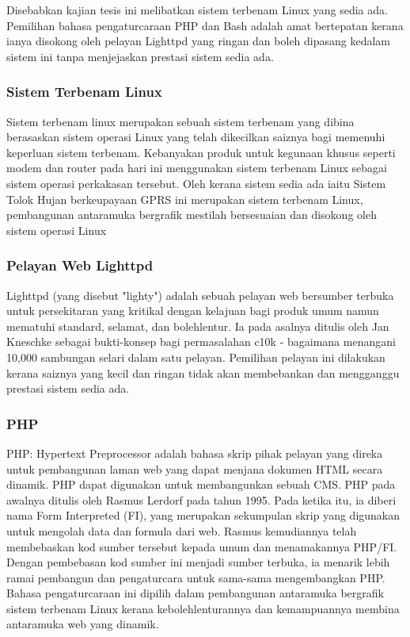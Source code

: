 Disebabkan kajian tesis ini melibatkan sistem terbenam Linux yang sedia ada. Pemilihan bahasa pengaturcaraan PHP dan Bash adalah amat bertepatan kerana ianya disokong oleh pelayan Lighttpd yang ringan dan boleh dipasang kedalam sistem ini tanpa menjejaskan prestasi sistem sedia ada. 

\subsubsection{Sistem Terbenam Linux}
Sistem terbenam linux merupakan sebuah sistem terbenam yang dibina berasaskan sistem operasi Linux yang telah dikecilkan saiznya bagi memenuhi keperluan sistem terbenam. Kebanyakan produk untuk kegunaan khusus seperti modem dan router pada hari ini menggunakan sistem terbenam Linux sebagai sistem operasi perkakasan tersebut. Oleh kerana sistem sedia ada iaitu Sistem Tolok Hujan berkeupayaan GPRS ini merupakan sistem terbenam Linux, pembangunan antaramuka bergrafik mestilah bersesuaian dan disokong oleh sistem operasi Linux

\subsubsection{Pelayan Web Lighttpd}
Lighttpd (yang disebut "lighty") adalah sebuah pelayan web bersumber terbuka untuk persekitaran yang kritikal dengan kelajuan bagi produk umum namun mematuhi standard, selamat, dan bolehlentur. Ia pada asalnya ditulis oleh   Jan Kneschke sebagai bukti-konsep bagi permasalahan c10k - bagaimana menangani 10,000 sambungan selari dalam satu pelayan. Pemilihan pelayan ini dilakukan kerana saiznya yang kecil dan ringan tidak akan membebankan dan mengganggu prestasi sistem sedia ada.

\subsubsection{PHP}
PHP: Hypertext Preprocessor adalah bahasa skrip pihak pelayan yang direka untuk pembangunan laman web yang dapat menjana dokumen HTML secara dinamik. PHP dapat digunakan untuk membangunkan sebuah CMS. PHP pada awalnya ditulis oleh Rasmus Lerdorf pada tahun 1995. Pada ketika itu, ia diberi nama Form Interpreted (FI), yang merupakan sekumpulan skrip yang digunakan untuk mengolah data dan formula dari web. Rasmus kemudiannya telah membebaskan kod sumber tersebut kepada umum dan menamakannya PHP/FI. Dengan pembebasan kod sumber ini menjadi sumber terbuka, ia menarik lebih ramai pembangun dan pengaturcara untuk sama-sama mengembangkan PHP. Bahasa pengaturcaraan ini dipilih dalam pembangunan antaramuka bergrafik sistem terbenam Linux kerana kebolehlenturannya dan kemampuannya membina antaramuka web yang dinamik.


